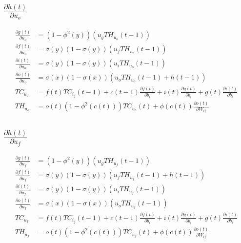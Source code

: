 \documentclass[twoside,11pt]{article}
\begin{document}
\subsection{$\frac{\partial h(t)}{\partial u_{o}}$}

\begin{equation}
\begin{aligned}
\frac{\partial g(t)}{\partial u_{o}} &=  (1-\phi^2(y))(u_g TH_{u_{o}}(t-1))  \\
\frac{\partial f(t)}{\partial u_{o}} &=  \sigma(y)(1-\sigma(y))( u_f TH_{u_{o}}(t-1)) \\
\frac{\partial i(t)}{\partial u_{o}}  &= \sigma(y)(1-\sigma(y))(u_i TH_{u_{o}}(t-1))  \\
\frac{\partial o(t)}{\partial u_{o}} &=  \sigma(x)(1-\sigma(x))( u_o TH_{u_{o}}(t-1) + h(t-1))  \\
TC_{u_{o}}&= f(t) TC_{i_j}(t-1) + c(t-1)\frac{\partial f(t)}{ \partial b_i} + i(t)\frac{\partial g(t) }{\partial b_i}  + g(t)\frac{\partial i(t) }{\partial b_i}  \\
TH_{u_{o}}&= o(t) (1-\phi^{2}(c(t))) TC_{u_{o}}(t)  + \phi(c(t)) \frac{\partial o(t)}{\partial W_{ij}}  
\end{aligned}
\end{equation}

\subsection{$\frac{\partial h(t)}{\partial u_{f}}$}

\begin{equation}
\begin{aligned}
\frac{\partial g(t)}{\partial u_{f}} &=  
(1-\phi^2(y))(u_g TH_{u_{f}}(t-1))  \\
\frac{\partial f(t)}{\partial u_{f}} &=  \sigma(y)(1-\sigma(y))( u_f TH_{u_{f}}(t-1) + h(t-1)) \\
\frac{\partial i(t)}{\partial u_{f}}  &= \sigma(y)(1-\sigma(y))(u_i TH_{u_{f}}(t-1))  \\
\frac{\partial o(t)}{\partial u_{f}} &=  \sigma(x)(1-\sigma(x))( u_o TH_{u_{f}}(t-1))  \\
TC_{u_{f}}&= f(t) TC_{i_j}(t-1) + c(t-1)\frac{\partial f(t)}{ \partial b_i} + i(t)\frac{\partial g(t) }{\partial b_i}  + g(t)\frac{\partial i(t) }{\partial b_i}  \\
TH_{u_{f}}&= o(t) (1-\phi^{2}(c(t))) TC_{u_{f}}(t)  + \phi(c(t)) \frac{\partial o(t)}{\partial W_{ij}}  
\end{aligned}
\end{equation}
\end{document}
